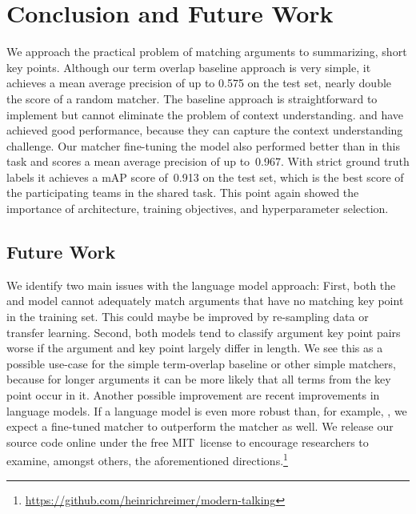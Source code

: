 \section{Conclusion and Future Work}\label{conclusion}

We approach the practical problem of matching arguments to summarizing, short key points.
Although our term overlap baseline approach is very simple, it achieves a mean average precision of up to 0.575 on the test set, nearly double the score of a random matcher. 
The baseline approach is straightforward to implement but cannot eliminate the problem of context understanding. 
\Roberta and \Bert have achieved good performance, because they can capture the context understanding challenge. 
Our matcher fine-tuning the \RobertaBase model also performed better than \Bert in this task and scores a mean average precision of up to~0.967. %
With strict ground truth labels it achieves a mAP score of~0.913 on the test set, which is the best score of the participating teams in the shared task.
This point again showed the importance of architecture, training objectives, and hyperparameter selection.

\subsection{Future Work}

We identify two main issues with the language model approach:
First, both the \BertBase and \RobertaBase model cannot adequately match arguments that have no matching key point in the training set.
This could maybe be improved by re-sampling data or transfer learning.
Second, both models tend to classify argument key point pairs worse if the argument and key point largely differ in length.
We see this as a possible use-case for the simple term-overlap baseline or other simple matchers, because for longer arguments it can be more likely that all terms from the key point occur in it.
Another possible improvement are recent improvements in language models. %
If a language model is even more robust than, for example, \Roberta, we expect a fine-tuned matcher to outperform the \RobertaBase matcher as well.
We release our source code online under the free MIT~license to encourage researchers to examine, amongst others, the aforementioned directions.\footnote{\url{https://github.com/heinrichreimer/modern-talking}}